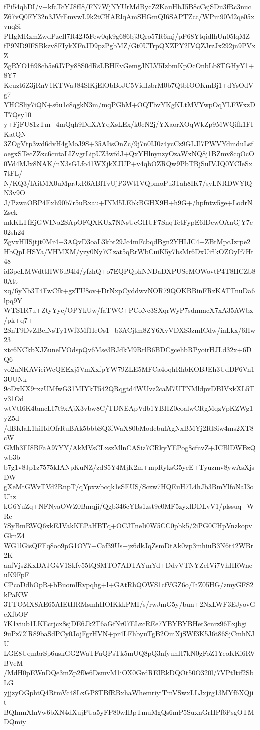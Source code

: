 fPi54qhDI/v+kfcTcYJ8fI8/FN7WjNYUrMdBycZ2KauHhJ5B8cCsjSDu3fRc3nuc
Z67vQ0FY32n3JVrEmvwL9k2tCHARlqAmSHGmQI6SAPTZcc/WPm90M2qe05xvnqSi
PHgMRzmZwdPzcIl7R42J5Few0qk9g686bj3Qro57R6mj/pP68YtqidlhUn05lqMZ
fP9ND9lFSBkzv8FIykXFnJD9pzPgbMZ/Gt0UTrpQXZPY2IVQZJrzJx292jn9PVxZ
ZgRYO1fi98cb5e6J7Py88S0dRsLBHEvGemgJNLV5IzbmKpOcOnbLb8TGHyY1+8Y7
Keuzt6Z3jRnV1KTWaJ84SlKjElObBoJC5VidIzbrM0b7QtbIOOKmBj1+dYsOdVg7
YHCSliy7iQN+s6u1c8qgkN3m/mqPGbM+OQTbvYKgKLtMVYwpOqYLFWxzDT7Qsy10
y+FjFU81zTm+4mQqh9DdXAYqXsLEx/k0eN2j/YXaorXOqWkZp9MWQifk1FIKatQN
3ZOgVtp3wd6dvH4gMoJ9S+35AIisOnZc/9j7n0IJ0z4ycCz9GLJl7PWVYdmduLsf
oegxSTecZZxc6cutaLIZvgrLipUZ3wfdJ+QxYHlnynzyOzaWxNQ8j1BZmv8cqOcO
0Vd4MJx8NAK/nX3sGLfo41WXjkXJUP+v4qbOZRQw9PbTBjSuIVJQ0YCIeSx7tFL/
N/KQ3/lAitMX0uMprJxR6ABlTvUjP3Wt1VQpmoPu3Tah8IK7/syLNRDWYlQN3v9O
J/PzwaOBP4Exh90b7r5uRxau+INM5LEbkBGHX9H+h9G+/hpfntw5ge+LodrNZsck
mkKLTfEjGWINa2SApOFQXKUx7NNsUcGHUF7SnqTetFypE6IDcwOAnGjY7c02sh24
ZgvxHlISjtjt0Mr4+3AQvD3oaL3kbt29Jc4mFcbqdBgn2YHLIC4+ZBtMpcJzrpe2
HbQpLHSYa/VHMXM/yzy0Ny7Clzat5qRrWbCuiK5y7bsMr6DxUiflkOZOyIf7Ht48
id3pcLMWdttHW6u94l4/yfzhQ+o7EQPQphNNDaDXPUSeMOWovtP4T8IICZb80Att
xq/6yNb3T4FwCfk+gzTU8ov+DrNxpCyddwvNOR79QOKBBinFRzKATTnuDa6lpq9Y
WTS1R7u+ZtyYyc/OPYkUw/faTWC+PCoNc3SXqrWyP7sdmmcX7xA35AWbx/pk+q7+
2SnT9DvZBelNsTy1Wf3Mf1IeOs1+b3ACjtm8ZY6XvVDXS3zmICdw/inLkx/6Hw23
xtc6NCkbXJZuneIVOdspQv6Mse3BJdkM9RrlB6BDCgcehbRPyoirHJLd32x+6DQ6
vo2uNKAVieiWcQEExj5VmXxfpYW79ZLE5MFCa4oqhRhbKOBJEh3UdDF6Vn13UUNk
9oDxKX9rxzUMfwG31MIYkT542QRqgtd4WUvz2caM7UTNMldpvDBIVxkXL5Tv31Od
wtVtI6K4bmcLI7t9xAjX3vbw8C/TDNEApVdb1YBHZ0coalwCRgMqzVpKZWg1yZ5d
/dBKlaL1hiHdOfrRuBAk5bbbSQ3fWaX80bModebulAgNxBMYj2RlSiw4ms2XT8cW
GMh3FI8BFaA97YY/AkMVsCLxszMlnCASiz7CRkyYEPog8cfnvZ+JCBlDWBzQwb3b
b7g1v8Jp1z7575kIANpKuNZ/zdS5Y4MjK2m+mpRyksG5yeE+Tyuzmv8ywAsXjsDW
gXeMtGWvTVd2RnpT/qYpxwbcqk1sSEUS/Sczw7HQEuH7L4hJb3BmYlfoNaI3oUhz
kG6YuZq+NFNyaOWZ0Bmqji/Qgb346cYBs1zst9c0MF5zyxlDDLvV1/plssuq+WRc
7SyBmRWQ6xkEJVakKEPaHBTq+OCJTneIi0W5CC0pbk5/2iPG0CHpVnzkopvGknZ4
WG1lGisQFFq8oo9pG1OY7+Caf39Us+jz6dkJqZsmDtAk0vp3mhiuB3N6t42WBr2K
anfVjs2KxDAJG4V1Skfv55tQSMTO7ADTAYmYd+DdvVTNYZeIVi7VhHRWneuK9FpF
CPcoDdhOpR+bBuomlRvpqhg+l+GAtRhQOWS1cfVGZ6o/lhZ05HG/zmyGFS2kPaKW
3TTOMX8AE65AIEtHRMsmhHOIKkkPMI/s/rwJmG5y/bun+2NxLWF3EJyovGeXfbOF
7K1viub1LKEcrjcx8sjDE6Jk2T6aGfNr07ELzcREe7YBYBYBHet3cnrz96Exjbgi
9uPz72lR89baSdPCy0JojFgrHVN+pr4LFhbyuTgB2OmXjSWf3K5J6t86SjCmhNJU
LGE8UqmbrSp6uskGG2WaTFuQPsTk5mUQ8pQ3nfyunH7kN0gFoZ1YeoKKi6RVBVeM
/MdH0pEWnDQe3mZp2f0e6DsmvM1iOX0GrdREIRkDQOt50O320l/7VPtItif2SbLG
yjjzyOGphtQ4RtmVc48LxGP8TBfRBxhaWhemriyiTmVSwxLLJxjrg13MYf6XQjit
BQImnXlnVw6bXN4dXujFUa5yFP80wIBpTmuMgQs6mP5SuxnGrHPf6PsgOTMDQmiy

